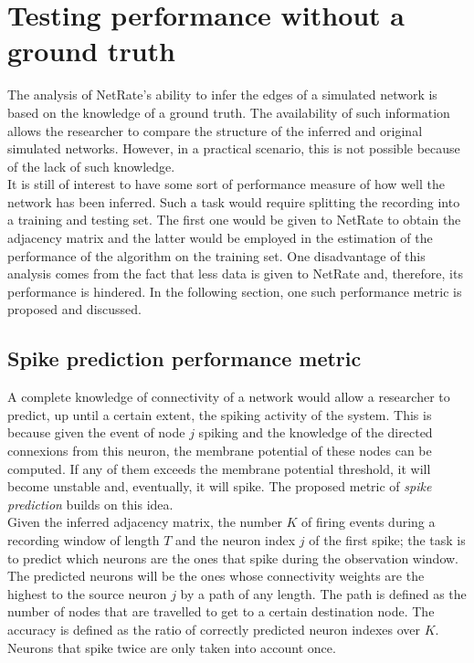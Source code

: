 
\chapter{Testing performance without a ground truth}


The analysis of NetRate's ability to infer the edges of a simulated network is based on the knowledge of a ground truth. The availability of such information allows the researcher to compare the structure of the inferred and original simulated networks. However, in a practical scenario, this is not possible because of the lack of such knowledge. \\ 

It is still of interest to have some sort of performance measure of how well the network has been inferred. Such a task would require splitting the recording into a training and testing set. The first one would be given to NetRate to obtain the adjacency matrix and the latter would be employed in the estimation of the performance of the algorithm on the training set. One disadvantage of this analysis comes from the fact that less data is given to NetRate and, therefore, its performance is hindered. In the following section, one such performance metric is proposed and discussed.\\

\section{Spike prediction performance metric}

A complete knowledge of connectivity of a network would allow a researcher to predict, up until a certain extent, the spiking activity of the system. This is because given the event of node \(j\) spiking and the knowledge of the directed connexions from this neuron, the membrane potential of these nodes can be computed. If any of them exceeds the membrane potential threshold, it will become unstable and, eventually, it will spike. The proposed metric of \textit{spike prediction} builds on this idea. \\

Given the inferred adjacency matrix, the number \(K\) of firing events during a recording window of length \(T\) and the neuron index \(j\) of the first spike; the task is to predict which neurons are the ones that spike during the observation window. The predicted neurons will be the ones whose connectivity weights are the highest to the source neuron \(j\) by a path of any length. The path is defined as the number of nodes that are travelled to get to a certain destination node. The accuracy is defined as the ratio of correctly predicted neuron indexes over \(K\). Neurons that spike twice are only taken into account once.\\

